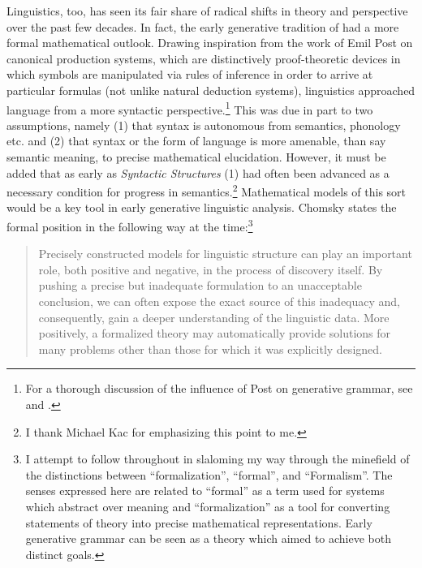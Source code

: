\documentclass[output=paper]{langscibook}
\begin{document}
Linguistics, too, has seen its fair share of radical shifts in theory and perspective over the past few decades. In fact, the early generative tradition of \cite{Chomsky1957} had a more formal mathematical outlook. Drawing inspiration from the work of Emil Post on canonical production systems, which are distinctively proof-theoretic devices in which symbols are manipulated via rules of inference in order to arrive at particular formulas (not unlike natural deduction systems), linguistics approached language from a more syntactic perspective.\footnote{For a thorough discussion of the influence of Post on generative grammar, see \cite{Pullum2011} and \cite{Lobina2017}.} This was due in part to two assumptions, namely (1) that syntax is autonomous from semantics, phonology etc. and (2) that syntax or the form of language is more amenable, than say semantic meaning, to precise mathematical elucidation. However, it must be added that as early as \textit{Syntactic Structures} (1) had often been advanced as a necessary condition for progress in semantics.\footnote{I thank Michael Kac for emphasizing this point to me.} Mathematical models of this sort would be a key tool in early generative linguistic analysis. Chomsky states the formal position in the following way at the time:\footnote{I attempt to follow \cite{Pullum2007} throughout in slaloming my way through the minefield of the distinctions between ``formalization'', ``formal'', and ``Formalism''. The senses expressed here are related to ``formal'' as a term used for systems which abstract over meaning and ``formalization'' as a tool for converting statements of theory into precise mathematical representations. Early generative grammar can be seen as a theory which aimed to achieve both distinct goals.} 

\begin{quote}
Precisely constructed models for linguistic structure can play an important role, both positive and negative, in the process of discovery itself. By pushing a precise but inadequate formulation to an unacceptable conclusion, we can often expose the exact source of this inadequacy and, consequently, gain a deeper understanding of the linguistic data. More positively, a formalized theory may automatically provide solutions for many problems other than those for which it was explicitly designed. \citep[5]{Chomsky1957}
\end{quote}
\end{document}
